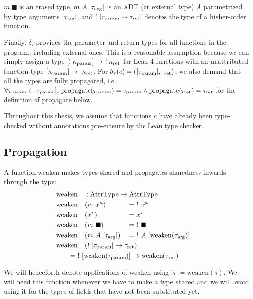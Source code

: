 $m\ \blacksquare$ is an erased type, $m\ A\ [\tau_{\mathrm{arg}}]$ is an ADT (or external type) $A$ parametrized by type arguments $[\tau_{\mathrm{arg}}]$, and $!\ [\tau_{\mathrm{param}} \to \tau_{\mathrm{ret}}]$ denotes the type of a higher-order function. 

Finally, $\delta_\tau$ provides the parameter and return types for all functions in the program, including external ones. This is a reasonable assumption because we can simply assign a type $[!\ \kappa_\param] \to \ !\ \kappa_\ret$ for Lean 4 functions with an unattributed function type $[\kappa_{\mathrm{param}}] \to \ \kappa_{\mathrm{ret}}$. For $\delta_\tau(c) = ([\tau_{\mathrm{param}}], \tau_{\mathrm{ret}})$, we also demand that all the types are fully propagated, i.e.\ $\forall \tau_{\mathrm{param}} \in [\tau_{\mathrm{param}}].\ \mathrm{propagate}(\tau_{\mathrm{param}}) = \tau_{\mathrm{param}} \land \mathrm{propagate}(\tau_{\mathrm{ret}}) = \tau_{\mathrm{ret}}$ for the definition of propagate below.

Throughout this thesis, we assume that functions $c$ have already been type-checked without annotations pre-erasure by the Lean type checker.

\subsection{Propagation}
A function weaken makes types shared and propagates sharedness inwards through the type:
\newcommand{\weaken}{\mathrm{weaken}}
\newcommand{\rebreak}[1]{\mathrlap{\qquad#1}}
\begin{alignat*}{3}
  &\weaken &&: \mathrlap{\AttrType \to \AttrType} \\
  &\weaken&&(m\ x^\kappa) &&=\ !\ x^\kappa \\
  &\weaken&&(x^\tau) &&= x^\tau \\
  &\weaken&&(m\ \blacksquare) &&=\ !\ \blacksquare \\
  &\weaken&&(m\ A\ [\tau_\arrg]) &&=\ !\ A\ [\weaken(\tau_\arrg)] \\
  &\weaken&&\mathrlap{(!\ [\tau_\param] \to \tau_\ret)} \\
  &\rebreak{= \ !\ [\weaken(\tau_\param)] \to \weaken(\tau_\ret)}
\end{alignat*}

We will henceforth denote applications of weaken using $!\tau := \weaken(\tau)$. We will need this function whenever we have to make a type shared and we will avoid using it for the types of fields that have not been substituted yet.

